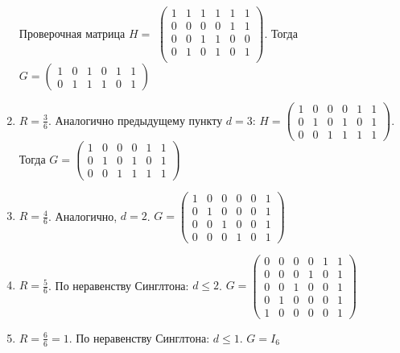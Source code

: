 \documentclass{article}
\begin{document}
\begin{enumerate}
    Проверочная матрица $H=$
    $
    \begin{pmatrix}
    1 & 1 & 1 & 1 & 1 & 1 \\
    0 & 0 & 0 & 0 & 1 & 1 \\
    0 & 0 & 1 & 1 & 0 & 0 \\
    0 & 1 & 0 & 1 & 0 & 1 \\
    \end{pmatrix}
    $. Тогда $G=
    \begin{pmatrix}
    1 & 0 & 1 & 0 & 1 & 1 \\
    0 & 1 & 1 & 1 & 0 & 1
    \end{pmatrix}$
    \item $R=\frac{3}{6}$. Аналогично предыдущему пункту $d=3$: $H = 
    \begin{pmatrix}
    1 & 0 & 0 & 0 & 1 & 1 \\
    0 & 1 & 0 & 1 & 0 & 1 \\
    0 & 0 & 1 & 1 & 1 & 1
    \end{pmatrix}$. 
    Тогда $G=
    \begin{pmatrix}
    1 & 0 & 0 & 0 & 1 & 1 \\
    0 & 1 & 0 & 1 & 0 & 1 \\
    0 & 0 & 1 & 1 & 1 & 1
    \end{pmatrix}$
    \item $R=\frac{4}{6}$. Аналогично, $d=2$.
    $G=
    \begin{pmatrix}
    1 & 0 & 0 & 0 & 0 & 1 \\
    0 & 1 & 0 & 0 & 0 & 1 \\
    0 & 0 & 1 & 0 & 0 & 1 \\
    0 & 0 & 0 & 1 & 0 & 1
    \end{pmatrix}$
    \item $R=\frac{5}{6}$. По неравенству Синглтона: $d \leq 2$.
    $G=
    \begin{pmatrix}
    0 & 0 & 0 & 0 & 1 & 1 \\
    0 & 0 & 0 & 1 & 0 & 1 \\
    0 & 0 & 1 & 0 & 0 & 1 \\
    0 & 1 & 0 & 0 & 0 & 1 \\
    1 & 0 & 0 & 0 & 0 & 1
    \end{pmatrix}$
    \item $R=\frac{6}{6}=1$. По неравенству Синглтона: $d \leq 1$.
    $G = I_{6}$
\end{enumerate}
\end{document}
